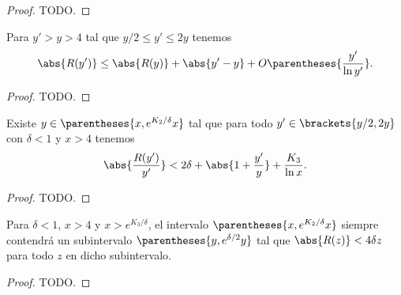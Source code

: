 \begin{proof}
    TODO.
\end{proof}

\begin{lemma}
    Para \(y' > y > 4\) tal que \(y/2 \leq y' \leq 2y\) tenemos
    \[
        \abs{R(y')} \leq \abs{R(y)} + \abs{y' - y} + O\parentheses{\frac{y'}{\ln y'}}.    
    \]
\end{lemma}

\begin{proof}
    TODO.
\end{proof}

\begin{lemma}
    Existe \(y \in \parentheses{x, e^{K_2/\delta}x}\) tal que
    para todo \(y' \in \brackets{y/2, 2y}\) con
    \(\delta < 1\) y \(x > 4\) tenemos
    \[
        \abs{\frac{R(y')}{y'}} < 2\delta + \abs{1 + \frac{y'}{y}} + \frac{K_3}{\ln x}.
    \]
\end{lemma}

\begin{proof}
    TODO.
\end{proof}

\begin{lemma}
    Para \(\delta < 1\), \(x > 4\) y \(x > e^{K_3/\delta}\),
    el intervalo \(\parentheses{x, e^{K_2/\delta}x}\) siempre contendr\'a
    un subintervalo \(\parentheses{y, e^{\delta/2}y}\) tal que
    \(\abs{R(z)} < 4 \delta z\) para todo \(z\) en dicho subintervalo.
\end{lemma}

\begin{proof}
    TODO.
\end{proof}
